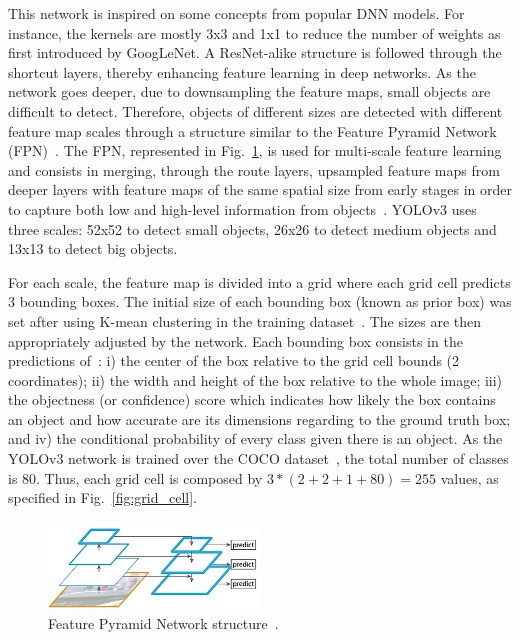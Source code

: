 This network is inspired on some concepts from popular DNN models. For instance, the kernels are mostly 3x3 and 1x1 to reduce the number of weights as first introduced by GoogLeNet. A ResNet-alike structure is followed through the shortcut layers, thereby enhancing feature learning in deep networks. As the network goes deeper, due to downsampling the feature maps, small objects are difficult to detect.
Therefore, objects of different sizes are detected with different feature map scales through a structure similar to the Feature Pyramid Network (FPN)~\cite{zhao:obj_survey}. The FPN, represented in Fig.~\ref{fig:fpn}, is used for multi-scale feature learning and consists in merging, through the route layers, upsampled feature maps from deeper layers with feature maps of the same spatial size from early stages in order to capture both low and high-level information from objects~\cite{zhao:obj_survey}. YOLOv3 uses three scales: 52x52 to detect small objects, 26x26 to detect medium objects and 13x13 to detect big objects.

For each scale, the feature map is divided into a grid where each grid cell predicts 3 bounding boxes. The initial size of each bounding box (known as prior box) was set after using K-mean clustering in the training dataset~\cite{Redmon2018YOLOv3AI}. The sizes are then appropriately adjusted by the network. Each bounding box consists in the predictions of~\cite{Redmon2015YouOL}: 
i) the center of the box relative to the grid cell bounds (2 coordinates);  
ii) the width and height of the box relative to the whole image;
iii) the objectness (or confidence) score which indicates how likely the box contains an object and how accurate are its dimensions regarding to the ground truth box;
and iv) the conditional probability of every class given there is an object. As the YOLOv3 network is trained over the COCO dataset~\cite{Redmon2018YOLOv3AI}, the total number of classes is 80. Thus, each grid cell is composed by $3 * (2 + 2 + 1 + 80) = 255$ values, as specified in Fig.~\ref{fig:grid_cell}.

\begin{figure}[!htb]
  \centering
  \includegraphics[width=0.5\textwidth]{Figures/fpn.png}
  \caption{Feature Pyramid Network structure~\cite{zhao:obj_survey}.}
  \label{fig:fpn}
\end{figure}

